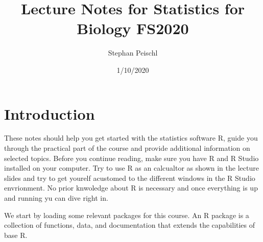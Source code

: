 \documentclass[]{article}
\title{Lecture Notes for Statistics for Biology FS2020}
\author{Stephan Peischl}
\date{1/10/2020}
\newenvironment{Shaded}{\begin{snugshade}}{\end{snugshade}}
\newcommand{\CommentTok}[1]{\textcolor[rgb]{0.56,0.35,0.01}{\textit{#1}}}
\newcommand{\ControlFlowTok}[1]{\textcolor[rgb]{0.13,0.29,0.53}{\textbf{#1}}}
\newcommand{\DataTypeTok}[1]{\textcolor[rgb]{0.13,0.29,0.53}{#1}}
\newcommand{\KeywordTok}[1]{\textcolor[rgb]{0.13,0.29,0.53}{\textbf{#1}}}
\newcommand{\NormalTok}[1]{#1}
\newcommand{\StringTok}[1]{\textcolor[rgb]{0.31,0.60,0.02}{#1}}
\begin{document}
\maketitle

{
\setcounter{tocdepth}{2}
\tableofcontents
}
\hypertarget{introduction}{%
\section{Introduction}\label{introduction}}

These notes should help you get started with the statistics software R,
guide you through the practical part of the course and provide
additional information on selected topics. Before you continue reading,
make sure you have R and R Studio installed on your computer. Try to use
R as an calcualtor as shown in the lecture slides and try to get yourelf
acustomed to the different windows in the R Studio envrionment. No prior
knwoledge about R is necessary and once everything is up and running yu
can dive right in.

We start by loading some relevant packages for this course. An R package
is a collection of functions, data, and documentation that extends the
capabilities of base R.

\begin{Shaded}
\end{Shaded}
\end{document}
